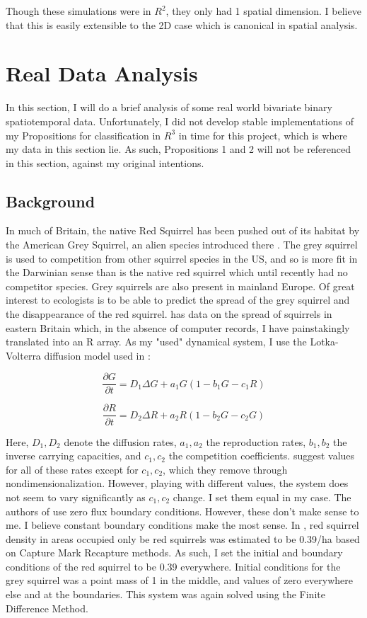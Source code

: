 \documentclass{article}
\begin{document}
	Though these simulations were in $R^2$, they only had 1 spatial dimension. I believe that this is easily extensible to the 2D case which is canonical in spatial analysis.
	
	\section{Real Data Analysis}
	
	In this section, I will do a brief analysis of some real world bivariate binary spatiotemporal data. Unfortunately, I did not develop stable implementations of my Propositions for classification in $R^3$ in time for this project, which is where my data in this section lie. As such, Propositions 1 and 2 will not be referenced in this section, against my original intentions. 
	
	\subsection{Background}
	
	In much of Britain, the native Red Squirrel has been pushed out of its habitat by the American Grey Squirrel, an alien species introduced there \cite{gurnellsquirrel}. The grey squirrel is used to competition from other squirrel species in the US, and so is more fit in the Darwinian sense than is the native red squirrel which until recently had no competitor species. Grey squirrels are also present in mainland Europe. Of great interest to ecologists is to be able to predict the spread of the grey squirrel and the disappearance of the red squirrel. \cite{reynolds1985details} has data on the spread of squirrels in eastern Britain which, in the absence of computer records, I have painstakingly translated into an R array. As my "used" dynamical system, I use the Lotka-Volterra \cite{goellotka} diffusion model used in \cite{okubo1989spatial}:
	
	$$\frac{\partial G}{\partial t} = D_1 \Delta G + a_1 G (1 - b_1 G - c_1 R)$$ 
	
	$$\frac{\partial R}{\partial t} = D_2 \Delta R + a_2 R (1 - b_2 G - c_2 G)$$
	
	Here, $D_1,D_2$ denote the diffusion rates, $a_1,a_2$ the reproduction rates, $b_1,b_2$ the inverse carrying capacities, and $c_1,c_2$ the competition coefficients. \cite{okubo1989spatial} suggest values for all of these rates except for $c_1, c_2$, which they remove through nondimensionalization. However, playing with different values, the system does not seem to vary significantly as $c_1,c_2$ change. I set them equal in my case. The authors of \cite{okubo1989spatial} use zero flux boundary conditions. However, these don't make sense to me. I believe constant boundary conditions make the most sense. In \cite{parker2008gray}, red squirrel density in areas occupied only be red squirrels was estimated to be 0.39/ha based on Capture Mark Recapture methods. As such, I set the initial and boundary conditions of the red squirrel to be 0.39 everywhere. Initial conditions for the grey squirrel was a point mass of 1 in the middle, and values of zero everywhere else and at the boundaries. This system was again solved using the Finite Difference Method.
	
\end{document}
